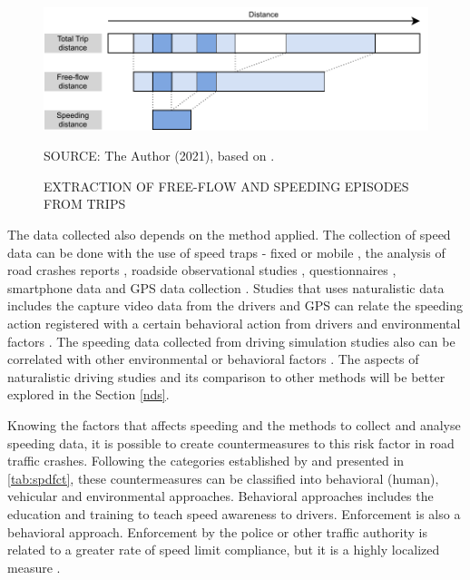 \begin{figure}[!htbp]
    \centering\footnotesize
    \captionsetup{font=footnotesize}
    \caption{EXTRACTION OF FREE-FLOW AND SPEEDING EPISODES FROM TRIPS}
    \includegraphics{fig/richards.pdf}
    \label{fig:ff}
    \par SOURCE: The Author (2021), based on \textcite{Richard2013}.
\end{figure}

The data collected also depends on the method applied. The collection of speed data can be done with the use of speed traps - fixed or mobile \cite{Hidalgo-Solorzano2020, WHO2008}, the analysis of road crashes reports \cite{Watson2015}, roadside observational studies \cite{Shinar2017}, questionnaires \cite{Dinh2013}, smartphone data \cite{Warren2019} and GPS data collection \cite{Moreno2013, Wang2018}. Studies that uses naturalistic data includes the capture video data from the drivers and GPS can relate the speeding action registered with a certain behavioral action from drivers \cite{Bastos2020a} and environmental factors \cite{Moreno2013}. The speeding data collected from driving simulation studies also can be correlated with other environmental or behavioral factors \cite{Yadav2020}. The aspects of naturalistic driving studies and its comparison to other methods will be better explored in the Section \ref{nds}. 

Knowing the factors that affects speeding and the methods to collect and analyse speeding data, it is possible to create countermeasures to this risk factor in road traffic crashes. Following the categories established by \textcite{Haddon1980} and presented in \autoref{tab:spdfct}, these countermeasures can be classified into behavioral (human), vehicular and environmental approaches. Behavioral approaches includes the education and training to teach speed awareness to drivers. Enforcement is also a behavioral approach. Enforcement by the police or other traffic authority is related to a greater rate of speed limit compliance, but it is a highly localized measure \cite{Shinar2017}. 

